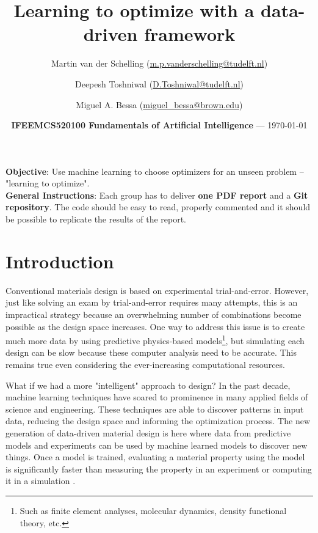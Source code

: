 \documentclass[10pt,a4paper,twoside]{article} %
\title{Learning to optimize with a data-driven framework} %
\author[1]{Martin van der Schelling (\href{mailto:m.p.vanderschelling@tudelft.nl}{m.p.vanderschelling@tudelft.nl})}
\author[2]{Deepesh Toshniwal (\href{mailto:D.Toshniwal@tudelft.nl}{D.Toshniwal@tudelft.nl})}
\author[3]{Miguel A. Bessa (\href{mailto:miguel\_bessa@brown.edu}{miguel\_bessa@brown.edu})}
\affil[1]{Doctoral Researcher at Delft University of Technology, The Netherlands}
\affil[2]{Assistant Professor at Delft University of Technology, The Netherlands}
\affil[3]{Associate Professor at Brown University, USA}
\date{\textbf{IFEEMCS520100 Fundamentals of Artificial Intelligence} --- \today} %
\begin{document}
\maketitle %


\begin{framed}
    \textbf{Objective}: Use machine learning to choose optimizers for an unseen problem -- "learning to optimize".\\
	\textbf{General Instructions}: Each group has to deliver \textbf{one PDF report} and a \textbf{Git repository}. The code should be easy to read, properly commented and it should be possible to replicate the results of the report.
\end{framed}


\section*{Introduction}

Conventional materials design is based on experimental trial-and-error. However, just like solving an exam by trial-and-error requires many attempts, this is an impractical strategy because an overwhelming number of combinations become possible as the design space increases. One way to address this issue is to create much more data by using predictive physics-based models\footnote{Such as finite element analyses, molecular dynamics, density functional theory, etc.}, but simulating each design can be slow because these computer analysis need to be accurate. This remains true even considering the ever-increasing computational resources.

What if we had a more "intelligent" approach to design? In the past decade, machine learning techniques have soared to prominence in many applied fields of science and engineering. These techniques are able to discover patterns in input data, reducing the design space and informing the optimization process. The new generation of data-driven material design is here where data from predictive models and experiments can be used by machine learned models to discover new things. Once a model is trained, evaluating a material property using the model is significantly faster than measuring the property in an experiment or computing it in a simulation \cite{Kadulkar2022, Guo2021}.
\end{document}
